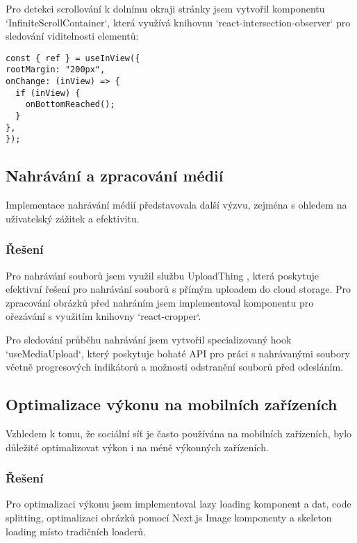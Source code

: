 \documentclass[12pt]{article}
\begin{document}
Pro detekci scrollování k dolnímu okraji stránky jsem vytvořil komponentu `InfiniteScrollContainer`, která využívá knihovnu `react-intersection-observer` pro sledování viditelnosti elementů:

\begin{lstlisting}[style=typescript]
const { ref } = useInView({
rootMargin: "200px",
onChange: (inView) => {
  if (inView) {
    onBottomReached();
  }
},
});
\end{lstlisting}

\subsection{Nahrávání a zpracování médií}

Implementace nahrávání médií představovala další výzvu, zejména s ohledem na uživatelský zážitek a efektivitu.

\subsubsection{Řešení}

Pro nahrávání souborů jsem využil službu UploadThing \citep{UploadThing}, která poskytuje efektivní řešení pro nahrávání souborů s přímým uploadem do cloud storage. Pro zpracování obrázků před nahráním jsem implementoval komponentu pro ořezávání s využitím knihovny `react-cropper`.

Pro sledování průběhu nahrávání jsem vytvořil specializovaný hook `useMediaUpload`, který poskytuje bohaté API pro práci s nahrávanými soubory včetně progresových indikátorů a možnosti odstranění souborů před odesláním.

\subsection{Optimalizace výkonu na mobilních zařízeních}

Vzhledem k tomu, že sociální síť je často používána na mobilních zařízeních, bylo důležité optimalizovat výkon i na méně výkonných zařízeních.

\subsubsection{Řešení}

Pro optimalizaci výkonu jsem implementoval lazy loading komponent a dat, code splitting, optimalizaci obrázků pomocí Next.js Image komponenty a skeleton loading místo tradičních loaderů.
\end{document}
